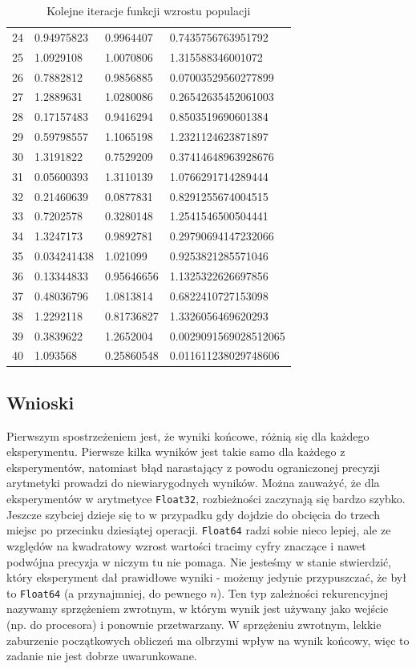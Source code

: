 \documentclass{article}
\begin{document}
{\begin{table}[h!]
\begin{tabular}{l l l l}
24 & 0.94975823 & 0.9964407 & 0.7435756763951792 \\
25 & 1.0929108 & 1.0070806 & 1.315588346001072 \\
26 & 0.7882812 & 0.9856885 & 0.07003529560277899 \\
27 & 1.2889631 & 1.0280086 & 0.26542635452061003 \\
28 & 0.17157483 & 0.9416294 & 0.8503519690601384 \\
29 & 0.59798557 & 1.1065198 & 1.2321124623871897 \\
30 & 1.3191822 & 0.7529209 & 0.37414648963928676 \\
31 & 0.05600393 & 1.3110139 & 1.0766291714289444 \\
32 & 0.21460639 & 0.0877831 & 0.8291255674004515 \\
33 & 0.7202578 & 0.3280148 & 1.2541546500504441 \\
34 & 1.3247173 & 0.9892781 & 0.29790694147232066 \\
35 & 0.034241438 & 1.021099 & 0.9253821285571046 \\
36 & 0.13344833 & 0.95646656 & 1.1325322626697856 \\
37 & 0.48036796 & 1.0813814 & 0.6822410727153098 \\
38 & 1.2292118 & 0.81736827 & 1.3326056469620293 \\
39 & 0.3839622 & 1.2652004 & 0.0029091569028512065 \\
40 & 1.093568 & 0.25860548 & 0.011611238029748606 \\
                \hline
            \end{tabular}
            \caption{Kolejne iteracje funkcji wzrostu populacji}
            \label{table:zad5}
            \end{table}
            }
        \subsection{Wnioski}
            Pierwszym spostrzeżeniem jest, że wyniki końcowe, różnią się dla każdego eksperymentu. Pierwsze kilka wyników jest takie samo dla każdego z eksperymentów, natomiast błąd narastający z powodu ograniczonej precyzji arytmetyki prowadzi do niewiarygodnych wyników. Można zauważyć, że dla eksperymentów w arytmetyce \texttt{Float32}, rozbieżności zaczynają się bardzo szybko. Jeszcze szybciej dzieje się to w przypadku gdy dojdzie do obcięcia do trzech miejsc po przecinku dziesiątej operacji. \texttt{Float64} radzi sobie nieco lepiej, ale ze względów na kwadratowy wzrost wartości tracimy cyfry znaczące i nawet podwójna precyzja w niczym tu nie pomaga. Nie jesteśmy w stanie stwierdzić, który eksperyment dał prawidłowe wyniki - możemy jedynie przypuszczać, że był to \texttt{Float64} (a przynajmniej, do pewnego $n$). Ten typ zależności rekurencyjnej nazywamy sprzężeniem zwrotnym, w którym wynik jest używany jako wejście (np. do procesora) i ponownie przetwarzany. W sprzężeniu zwrotnym, lekkie zaburzenie początkowych obliczeń ma olbrzymi wpływ na wynik końcowy, więc to zadanie nie jest dobrze uwarunkowane.
        
\end{document}
